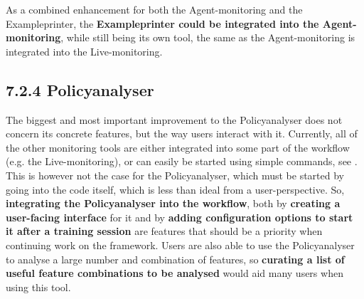 As a combined enhancement for both the Agent-monitoring and the Exampleprinter, the \textbf{Exampleprinter could be integrated into the Agent-monitoring}, while still being its own tool, the same as the Agent-monitoring is integrated into the Live-monitoring.

\subsection*{7.2.4 Policyanalyser}\label{subsec:FuturePolicyAnalyser}

The biggest and most important improvement to the Policyanalyser does not concern its concrete features, but the way users interact with it. Currently, all of the other monitoring tools are either integrated into some part of the workflow (e.g. the Live-monitoring), or can easily be started using simple commands, see . This is however not the case for the Policyanalyser, which must be started by going into the code itself, which is less than ideal from a user-perspective. So, \textbf{integrating the Policyanalyser into the workflow}, both by \textbf{creating a user-facing interface} for it and by \textbf{adding configuration options to start it after a training session} are features that should be a priority when continuing work on the framework. Users are also able to use the Policyanalyser to analyse a large number and combination of features, so \textbf{curating a list of useful feature combinations to be analysed} would aid many users when using this tool.